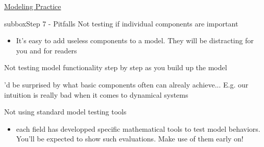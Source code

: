 \begin{textbox}{\href{https://compneuro.neuromatch.io/projects/modelingsteps/ModelingSteps_5through10.html}{Modeling Practice  } }
\begin{subbox}{subbox}{Step 7 - Pitfalls }
Not testing if individual components are important
  \begin{itemize}
    \item It's easy to add useless components to a model. They will be distracting for you and for readers\end{itemize}


Not testing model functionality step by step as you  build up the model
  \begin{itemize}
    \itemYou'd be surprised by what basic components often can alrealy achieve... E.g. our intuition is really bad when it comes to dynamical systems\end{itemize}


Not using standard model testing tools
  \begin{itemize}
    \item each field has developped specific mathematical tools to test model behaviors. You'll be expected to show such evaluations. Make use of them early on!\end{itemize}


\end{subbox}
 
 
\end{textbox}

